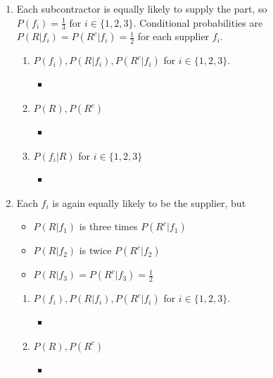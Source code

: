 \documentclass[letterpaper]{article}
\begin{document}
\begin{enumerate}

  \item Each subcontractor is equally likely to supply the part, so $P(f_i) = \frac{1}{3} \textrm{ for } i\in \{1,2,3\}$.  Conditional probabilities are $P(R|f_i)=P(R^c|f_i) = \frac{1}{2}$ for each supplier $f_i$.

  \begin{enumerate}
    \item $P(f_i),P(R|f_i),P(R^c|f_i)$ for $i \in \{1,2,3\}$.
      \begin{itemize}
        \item
      \end{itemize}

    \item $P(R), P(R^c)$
      \begin{itemize}
        \item
      \end{itemize}

    \item $P(f_i|R)$ for $i \in \{1,2,3\}$
    \begin{itemize}
      \item
    \end{itemize}

  \end{enumerate}

  \item Each $f_i$ is again equally likely to be the supplier, but
  \begin{itemize}
    \item $P(R|f_1)$ is three times $P(R^c|f_1)$
    \item $P(R|f_2)$ is twice $P(R^c|f_2)$
    \item $P(R|f_3) =P(R^c|f_3) = \frac{1}{2}$
  \end{itemize}

  \begin{enumerate}
    \item $P(f_i),P(R|f_i),P(R^c|f_i)$ for $i \in \{1,2,3\}$.
      \begin{itemize}
        \item
      \end{itemize}

    \item $P(R), P(R^c)$
      \begin{itemize}
        \item
      \end{itemize}


\end{enumerate}
\end{enumerate}
\end{document}
